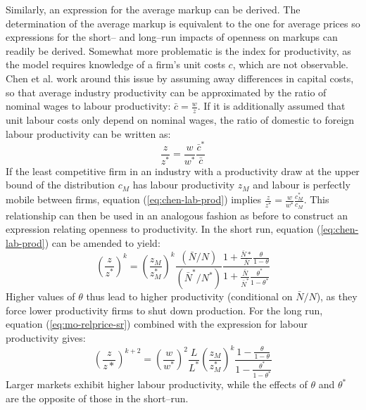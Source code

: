 Similarly, an expression for the average markup can be derived. The determination of the average markup is equivalent to the one for average prices so expressions for the short-- and long--run impacts of openness on markups can readily be derived. Somewhat more problematic is the index for productivity, as the model requires knowledge of a firm's unit costs $c$, which are not observable. Chen et al. work around this issue by assuming away differences in capital costs, so that average industry productivity can be approximated by the ratio of nominal wages to labour productivity: $\bar{c} = \frac{w}{z}$. If it is additionally assumed that unit labour costs only depend on nominal wages, the ratio of domestic to foreign labour productivity can be written as:
\begin{equation}\label{eq:chen-lab-prod}
\frac{z}{z^*} = \frac{w}{w^*} \frac{\bar{c}^*}{\bar{c}}
\end{equation}
If the least competitive firm in an industry with a productivity draw at the upper bound of the distribution $c_M$ has labour productivity $z_M$ and labour is perfectly mobile between firms, equation (\ref{eq:chen-lab-prod}) implies $\frac{z}{z^*} = \frac{w}{w^*} \frac{c_M^*}{c_M}$. This relationship can then be used in an analogous fashion as before to construct an expression relating openness to productivity. In the short run, equation (\ref{eq:chen-lab-prod}) can be amended to yield:
\begin{equation}\label{eq:chen-prod-sr}
\left( \frac{z}{z^*} \right)^k = \left( \frac{z_M}{z_M^*} \right)^k \frac{(\bar{N}/N)}{(\bar{N}^*/N^*)} \frac{1+ \frac{\bar{N}*}{\bar{N}} \frac{\theta}{1-\theta}}{1+ \frac{\bar{N}}{\bar{N}^*} \frac{\theta^*}{1-\theta^*}} 
\end{equation}
Higher values of $\theta$ thus lead to higher productivity (conditional on $\bar{N}/N$), as they force lower productivity firms to shut down production. For the long run, equation (\ref{eq:mo-relprice-sr}) combined with the expression for labour productivity gives:
\begin{equation}\label{eq:chen-prod-lr}
\left( \frac{z}{z*} \right)^{k+2} = \left( \frac{w}{w^*} \right)^2 \frac{L}{L^*} \left( \frac{z_M}{z_M^*} \right)^k \frac{1-\frac{\theta}{1-\theta}}{1-\frac{\theta^*}{1-\theta^*}}
\end{equation} 
Larger markets exhibit higher labour productivity, while the effects of $\theta$ and $\theta^*$ are the opposite of those in the short--run.


